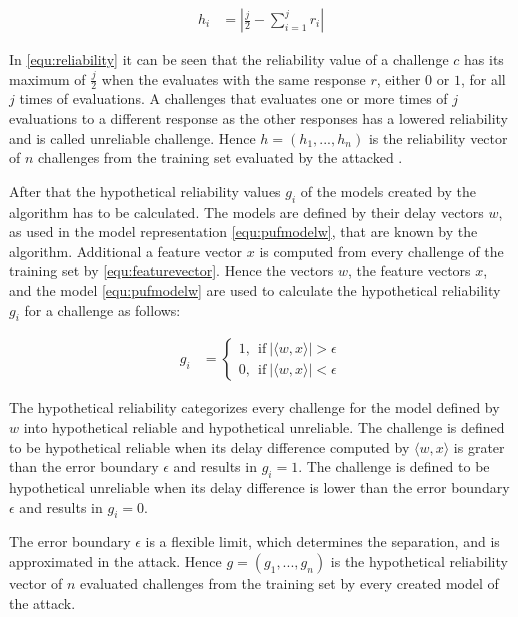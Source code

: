 \begin{align}
h_i &= |\frac{j}{2} - \sum_{i = 1}^{j}r_i| \label{equ:reliability}
\end{align}

In \ref{equ:reliability} it can be seen that the reliability value of a challenge $c$ has its maximum of $\frac{j}{2}$ when the \puf evaluates with the same response $r$, either $0$ or $1$, for all $j$ times of evaluations. %
A challenges that evaluates one or more times of $j$ evaluations to a different response as the other responses has a lowered reliability and is called unreliable challenge.
Hence $h = (h_1, ..., h_n)$ is the reliability vector of $n$ challenges from the training set evaluated by the attacked \puf.

After that the hypothetical reliability values $g_i$ of the models created by the algorithm has to be calculated.
The models are defined by their delay vectors $w$, as used in the \apuf model representation \ref{equ:pufmodelw}, that are known by the algorithm. %
Additional a feature vector $x$ is computed from every challenge of the training set by \ref{equ:featurevector}.
Hence the vectors $w$, the feature vectors $x$, and the \apuf model \ref{equ:pufmodelw} are used to calculate the hypothetical reliability $g_i$ for a challenge as follows:

\begin{equation}
\begin{aligned}
g_i &=
\begin{cases}
1,\ \ \text{if}\ |\langle w, x \rangle| > \epsilon\\
0,\ \ \text{if}\ |\langle w, x \rangle| < \epsilon \label{equ:hypotheticalreliability}
\end{cases}
\end{aligned}
\end{equation}

The hypothetical reliability categorizes every challenge for the model defined by $w$ into hypothetical reliable and hypothetical unreliable. %
The challenge is defined to be hypothetical reliable when its delay difference computed by $\langle w, x \rangle$ is grater than the error boundary $\epsilon$ and results in $g_i = 1$.
The challenge is defined to be hypothetical unreliable when its delay difference is lower than the error boundary $\epsilon$ and results in $g_i = 0$. %

The error boundary $\epsilon$ is a flexible limit, which determines the separation, and is approximated in the attack.
Hence $g = (g_1, ..., g_n)$ is the hypothetical reliability vector of $n$ evaluated challenges from the training set by every created model of the attack.

